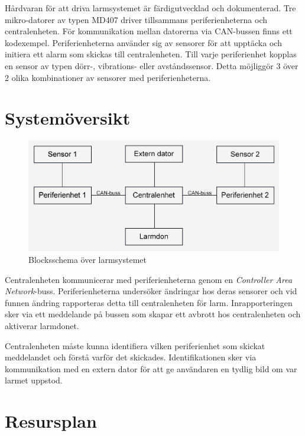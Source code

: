 \documentclass[a4paper]{article}
\begin{document}
Hårdvaran för att driva larmsystemet är färdigutvecklad och dokumenterad. Tre mikro-datorer av typen MD407 driver tillsammans periferienheterna och centralenheten. För kommunikation mellan datorerna via CAN-bussen finns ett kodexempel. Periferienheterna använder sig av sensorer för att upptäcka och initiera ett alarm som skickas till centralenheten. Till varje periferienhet kopplas en sensor av typen dörr-, vibrations- eller avståndssensor. Detta möjliggör 3 över 2 olika kombinationer av sensorer med periferienheterna.


\section{Systemöversikt}

\begin{figure}[H]
    \centering
    \includegraphics[width=\textwidth]{blockschema.png}
    \caption{Blocksschema över larmsystemet}
\end{figure}

Centralenheten kommunicerar med periferienheterna genom en \textit{Controller Area Network}-buss. Periferienheterna undersöker ändringar hos deras sensorer och vid funnen ändring rapporteras detta till centralenheten för larm. Inrapporteringen sker via ett meddelande på bussen som skapar ett avbrott hos centralenheten och aktiverar larmdonet.

Centralenheten måste kunna identifiera vilken periferienhet som skickat meddelandet och förstå varför det skickades. Identifikationen sker via kommunikation med en extern dator för att ge användaren en tydlig bild om var larmet uppstod.

\section{Resursplan}
\end{document}
